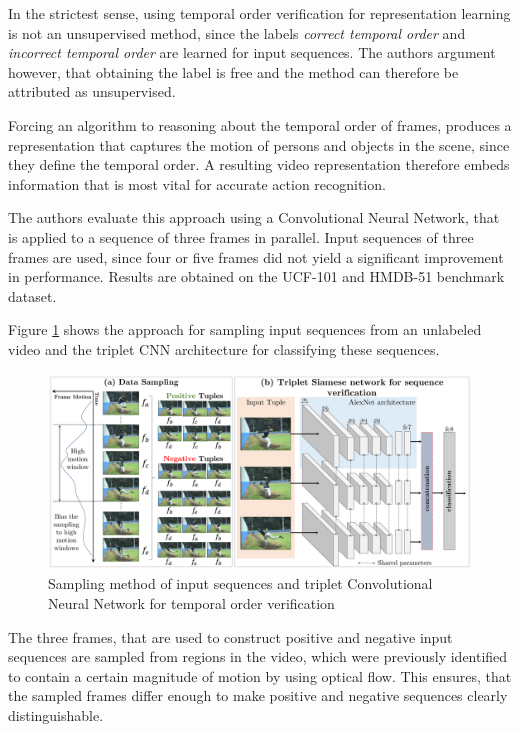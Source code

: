 In the strictest sense, using temporal order verification for representation learning is not an unsupervised method, since the labels \textit{correct temporal order} and \textit{incorrect temporal order} are learned for input sequences.
The authors argument however, that obtaining the label is free and the method can therefore be attributed as unsupervised.

Forcing an algorithm to reasoning about the temporal order of frames, produces a representation that captures the motion of persons and objects in the scene, since they define the temporal order.
A resulting video representation therefore embeds information that is most vital for accurate action recognition.

The authors evaluate this approach using a Convolutional Neural Network, that is applied to a sequence of three frames in parallel.
Input sequences of three frames are used, since four or five frames did not yield a significant improvement in performance.
Results are obtained on the UCF-101 and HMDB-51 benchmark dataset.

Figure \ref{fig:shufflelearn_approach} shows the approach for sampling input sequences from an unlabeled video and the triplet CNN architecture for classifying these sequences.

\begin{figure}[H]
    \centering
    \includegraphics[width=\textwidth]{img_deep/shufflelearn_approach}
    \caption{Sampling method of input sequences and triplet Convolutional Neural Network for temporal order verification \cite{misra_shuffle_2016}}
    \label{fig:shufflelearn_approach}
\end{figure}

The three frames, that are used to construct positive and negative input sequences are sampled from regions in the video, which were previously identified to contain a certain magnitude of motion by using optical flow.
This ensures, that the sampled frames differ enough to make positive and negative sequences clearly distinguishable.

